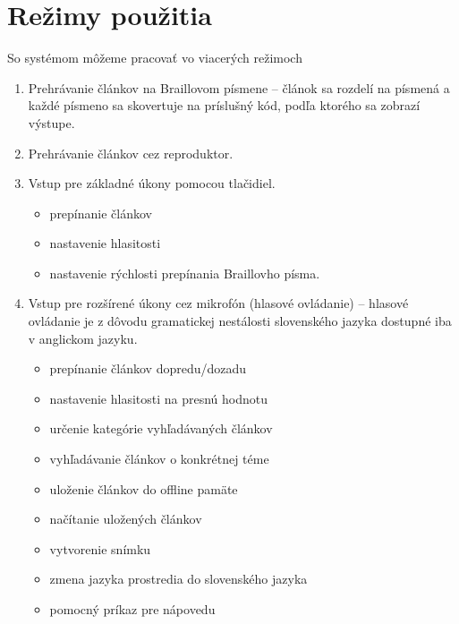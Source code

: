 \documentclass{template/socthesis}
\begin{document}
\section{Režimy použitia}
So systémom môžeme pracovať vo viacerých režimoch
\begin{enumerate}
\item Prehrávanie článkov na Braillovom písmene -- článok sa rozdelí na písmená a každé písmeno sa skovertuje na príslušný kód, podľa ktorého sa zobrazí výstupe.
\item Prehrávanie článkov cez reproduktor.
\item Vstup pre základné úkony pomocou tlačidiel. 
\begin{itemize}
\item prepínanie článkov
\item nastavenie hlasitosti
\item nastavenie rýchlosti prepínania Braillovho písma.
\end{itemize}
\item Vstup pre rozšírené úkony cez mikrofón (hlasové ovládanie) -- hlasové ovládanie je z dôvodu gramatickej nestálosti slovenského jazyka dostupné iba v anglickom jazyku.
\begin{itemize}
\item prepínanie článkov dopredu/dozadu
\item nastavenie hlasitosti na presnú hodnotu
\item určenie kategórie vyhľadávaných článkov 
\item vyhľadávanie článkov o konkrétnej téme
\item uloženie článkov do offline pamäte
\item načítanie uložených článkov
\item vytvorenie snímku
\item zmena jazyka prostredia do slovenského jazyka
\item pomocný príkaz pre nápovedu
\end{itemize}
\end{enumerate}

\printbibliography[title=Zoznam použitej literatúry]
\end{document}
